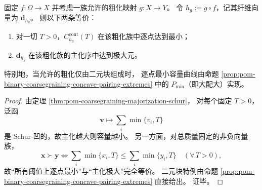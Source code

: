 \begin{corollary}[全预算逐点最小容量曲线与最大主化等价]\label{cor:pom-capacity-pointwise-minimal-majorization}
固定 \(f:\Omega\to X\) 并考虑一族允许的粗化映射 \(g:X\to Y\)。
令 \(h_g:=g\circ f\)，记其纤维向量为 \(\mathbf d_{h_g}\)。
则以下两条等价：
\begin{enumerate}
  \item 对一切 \(T>0\)，\(C_{h_g}^{\mathrm{cont}}(T)\) 在该粗化族中逐点达到最小；
  \item \(\mathbf d_{h_g}\) 在该粗化族的主化序中达到极大元。
\end{enumerate}
特别地，当允许的粗化仅由二元块组成时，
逐点最小容量曲线由命题 \ref{prop:pom-binary-coarsegraining-concave-pairing-extremes}
中的 \(P_{\min}\)（即大配大）实现。
\end{corollary}
\begin{proof}
由定理 \ref{thm:pom-coarsegraining-majorization-schur}，
对每个固定 \(T>0\)，泛函
\[
\mathbf v\longmapsto \sum_i \min\{v_i,T\}
\]
是 Schur-凹的，故主化越大则容量越小。
另一方面，对总质量固定的非负向量族，
\[
\mathbf x\succ \mathbf y
\iff
\sum_i\min\{x_i,T\}\le \sum_i\min\{y_i,T\}\quad(\forall\,T>0),
\]
故“所有阈值上逐点最小”与“主化极大”完全等价。
二元块特例由命题 \ref{prop:pom-binary-coarsegraining-concave-pairing-extremes} 直接给出。
证毕。
\end{proof}

